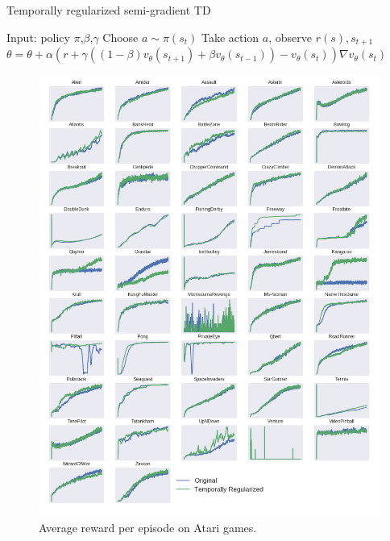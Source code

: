 \documentclass{article}
\newcommand{\param}{\beta}
\newcommand{\V}{v}
\begin{document}
\begin{algorithm}[H]
\caption{Temporally regularized semi-gradient TD}
\begin{spacing}{1.2}
\begin{algorithmic}[1]
    \STATE Input: policy $\pi$,$\param$,$\gamma$
        \STATE Choose $a \sim \pi(s_t)$
        \STATE Take action $a$, observe $r(s),s_{t+1}$
        \STATE $\theta = \theta + \alpha (r + \gamma((1-\param) \V_{\theta}(s_{t+1}) + \param \V_{\theta}(s_{t-1})) - \V_{\theta}(s_t))\nabla \V_{\theta}(s_{t}) $
    \ENDFOR
\end{algorithmic}
\end{spacing}
\end{algorithm}
\begin{figure}
    \centering
    \includegraphics[scale=0.5]{plot_atari.png}
    \caption{Average reward per episode on Atari games.}
    \label{fig:my_label}
\end{figure}
\end{document}
